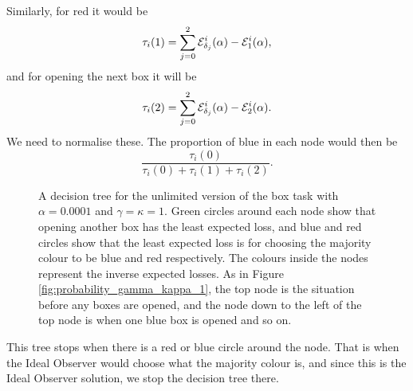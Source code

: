 Similarly, for red it would be
\begin{equation*}
    \tau_i(1) = \sum_{j=0}^2 \mathcal{E}_{\delta_j}^i(\alpha) - \mathcal{E}_1^i(\alpha),
\end{equation*}
and for opening the next box it will be
\begin{equation*}
    \tau_i(2) = \sum_{j=0}^2 \mathcal{E}_{\delta_j}^i(\alpha) - \mathcal{E}_2^i(\alpha).
\end{equation*}
We need to normalise these. The proportion of blue in each node would then be
\begin{equation*}
    \frac{\tau_i(0)}{\tau_i(0)+\tau_i(1)+\tau_i(2)}.
\end{equation*}
\begin{figure}
    \centering
    \scalebox{0.7}{}
    \caption[IO solution, unlimited. $\alpha=0.0001$, $\gamma=\kappa=1$]{A decision tree for the unlimited version of the box task with $\alpha = 0.0001$ and $\gamma=\kappa=1$. Green circles around each node show that opening another box has the least expected loss, and blue and red circles show that the least expected loss is for choosing the majority colour to be blue and red respectively. The colours inside the nodes represent the inverse expected losses. As in Figure \ref{fig:probability_gamma_kappa_1}, the top node is the situation before any boxes are opened, and the node down to the left of the top node is when one blue box is opened and so on.}
    \label{fig:unlim_a0.0001_gk1}
\end{figure}
This tree stops when there is a red or blue circle around the node. That is when the Ideal Observer would choose what the majority colour is, and since this is the Ideal Observer solution, we stop the decision tree there. 


